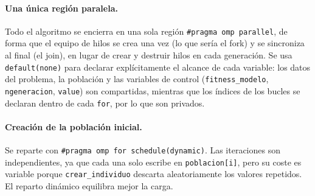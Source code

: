 \documentclass[12pt]{article}
\begin{document}
\begin{enumerate}
\paragraph{Una única región paralela.}
Todo el algoritmo se encierra en una sola región \texttt{\#pragma omp parallel}, de forma que el equipo de hilos se crea una vez (lo que sería el fork) y se sincroniza al final (el join), en lugar de crear y destruir hilos en cada generación. Se usa \texttt{default(none)} para declarar explícitamente el alcance de cada variable: los datos del problema, la población y las variables de control (\texttt{fitness\_modelo}, \texttt{ngeneracion}, \texttt{value}) son compartidas, mientras que los índices de los bucles se declaran dentro de cada \texttt{for}, por lo que son privados.

\paragraph{Creación de la población inicial.}
Se reparte con \texttt{\#pragma omp for schedule(dynamic)}. Las iteraciones son independientes, ya que cada una solo escribe en \texttt{poblacion[i]}, pero su coste es variable porque \texttt{crear\_individuo} descarta aleatoriamente los valores repetidos. El reparto dinámico equilibra mejor la carga.


\end{enumerate}
\end{document}
